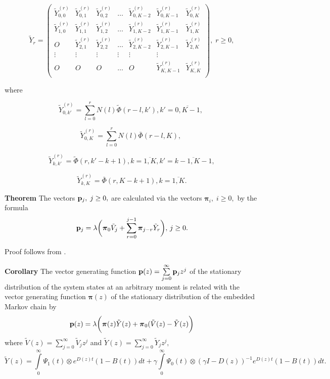 \documentclass[12pt, a4paper]{article}
\newcommand{\bs}{\boldsymbol}
\begin{document}
 $$
     \tilde{Y}_r =\left(\begin{array}{ccccccc}
       \tilde{Y}_{0,0}^{(r)}     & \tilde{Y}_{0,1}^{(r)}    &  \tilde{Y}_{0,2}^{(r)}  & \ldots  &  \tilde{Y}_{0,K-2}^{(r)}&     \tilde{Y}_{0,K-1}^{(r)}&    \tilde{Y}_{0,K}^{(r)}  \\
       \tilde{Y}_{1,0}^{(r)}    &       \tilde{Y}_{1,1}^{(r)}     &  \tilde{Y}_{1,2}^{(r)}    &  \ldots  &   \tilde{Y}_{1,K-2}^{(r)}&  \tilde{Y}_{1,K-1}^{(r)}&    \tilde{Y}_{1,K}^{(r)} \\
       O&  \tilde{Y}_{2,1}^{(r)}    &       \tilde{Y}_{2,2}^{(r)}        &  \ldots  &   \tilde{Y}_{2,K-2}^{(r)}&  \tilde{Y}_{2,K-1}^{(r)}&    \tilde{Y}_{2,K}^{(r)}   \\
             \vdots & \vdots &\vdots& \vdots& \vdots& \vdots         \\
              O& O    &      O        &  \ldots  &    O& \tilde{Y}_{K,K-1}^{(r)}&    \tilde{Y}_{K,K}^{(r)}   \\
      \end{array} \right),\; r\geq0,
  $$

where

$$
\tilde{Y}_{0,k'}^{(r)} = \sum\limits_{l=0}^{r} N(l)\tilde{\Phi}(r-l,k'),
k'=\overline{0,K-1},\;
$$

$$
\tilde{Y}_{0,K}^{(r)} = \sum\limits_{l=0}^{r} N(l){\bar\Phi}(r-l,K),\;
$$

$$
\tilde{Y}_{k,k'}^{(r)} = \tilde{\Phi}(r,k'-k+1),
 k=\overline{1,K}, k'=\overline{k-1,K-1},
$$


$$
\tilde{Y}_{k,K}^{(r)} = {\bar\Phi}(r,K-k+1),
 k=\overline{1,K}.
 $$




{\bf Theorem} The vectors ${\bf p}_j,\; j\geq 0, $ are calculated via the vectors ${\bs \pi}_i,\; i\geq 0,$ by the formula
$$
{\bf p}_j=\lambda \biggl({\bs \pi}_0 \tilde {V}_j+\sum\limits_{r=0}^{j-1}{\bs \pi}_{j-r}\tilde{Y}_r\biggr), \,  j\geq 0.
$$

Proof follows from \cite{cinlar}.


{\bf Corollary} The vector generating function ${\bf p}(z)=\sum\limits_{j=0}^{\infty} {\bf p}_j z^j$ of the stationary distribution of the system states at an arbitrary moment is related with the vector generating function ${\boldsymbol \pi}(z)$ of  the stationary distribution of the embedded Markov chain by
$$
{\bf p}(z)=\lambda\biggl( {\boldsymbol \pi}(z)\tilde Y(z)+ {\boldsymbol \pi}_0(\tilde V(z)-\tilde Y(z)\biggr)
$$
where $\tilde V(z)= \sum\limits_{j=0}^{\infty} \tilde {V}_j z^j$ and $\tilde Y(z)= \sum\limits_{j=0}^{\infty} \tilde {Y}_j z^j,$
$$
\tilde Y(z)=\int\limits_{0}^{\infty} \Psi_1(t) \otimes e^{D(z)t} (1-B(t))dt+ \gamma \int\limits_{0}^{\infty}\Psi_0(t) \otimes (\gamma I -D(z))^{-1} e^{D(z)t} (1- B(t))dt.
$$
\end{document}
